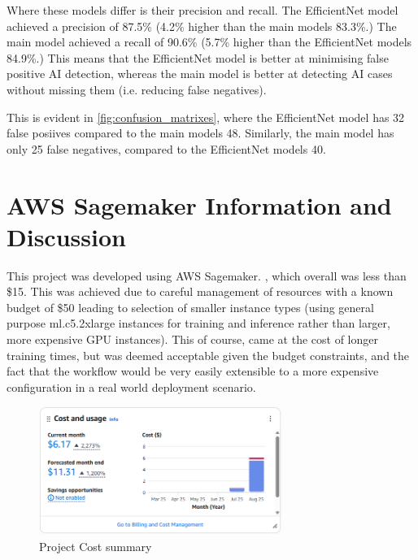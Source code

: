 Where these models differ is their precision and recall. The EfficientNet model achieved a precision of 87.5\% (4.2\% higher than the main models 83.3\%.) The main model achieved a recall of 90.6\% (5.7\% higher than the EfficientNet models 84.9\%.) This means that the EfficientNet model is better at minimising false positive AI detection, whereas the main model is better at detecting AI cases without missing them (i.e. reducing false negatives). 

This is evident in \cref{fig:confusion_matrixes}, where the EfficientNet model has 32 false posiives compared to the main models 48. Similarly, the main model has only 25 false negatives, compared to the EfficientNet models 40.

\section{AWS Sagemaker Information and Discussion}

This project was developed using AWS Sagemaker. , which overall was less than \$15. This was achieved due to careful management of resources with a known budget of \$50 leading to selection of smaller instance types (using general purpose ml.c5.2xlarge instances for training and inference rather than larger, more expensive GPU instances). This of course, came at the cost of longer training times, but was deemed acceptable given the budget constraints, and the fact that the workflow would be very easily extensible to a more expensive configuration in a real world deployment scenario.

\begin{figure}[h]
    \centering
    \includegraphics[width=300px]{figures/aws_cost_summary.png} %
    \centering
    \caption{Project Cost summary} %
    \label{fig:aws_cost_summary} %
\end{figure}




